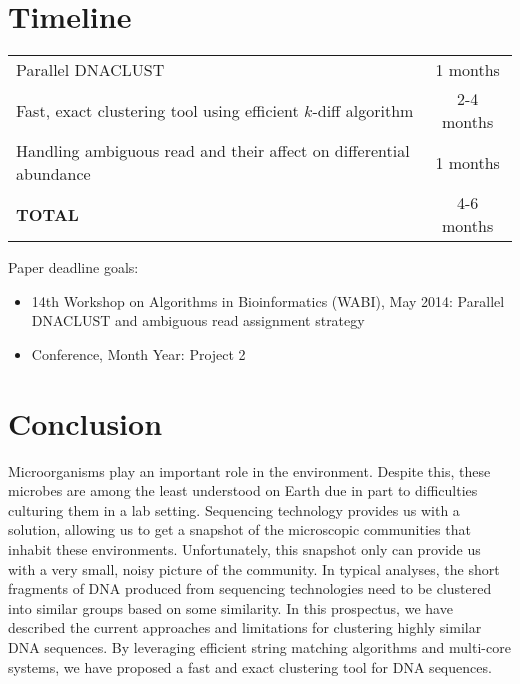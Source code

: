 \documentclass{article}
\begin{document}




%

\section{Timeline}

\begin{center}
\begin{tabular}{|l|c|}
\hline
Parallel DNACLUST & 1 months \\
Fast, exact clustering tool using efficient $k$-diff algorithm & 2-4 months \\
Handling ambiguous read and their affect on differential abundance & 1 months \\
\hline
\textbf{TOTAL} & 4-6 months \\
\hline
\end{tabular}
\end{center}

Paper deadline goals:

\begin{itemize}
\item 14th Workshop on Algorithms in Bioinformatics (WABI), May 2014: Parallel DNACLUST and ambiguous read assignment strategy
\item Conference, Month Year: Project 2
\end{itemize}


\section{Conclusion}

Microorganisms play an important role in the environment.
Despite this, these microbes are among the least understood on Earth due in part to difficulties culturing them in a lab setting.
Sequencing technology provides us with a solution, allowing us to get a snapshot of the microscopic communities that inhabit these environments.
Unfortunately, this snapshot only can provide us with a very small, noisy picture of the community.
In typical analyses, the short fragments of DNA produced from sequencing technologies need to be clustered into similar groups based on some similarity.
In this prospectus, we have described the current approaches and limitations for clustering highly similar DNA sequences.
By leveraging efficient string matching algorithms and multi-core systems, we have proposed a fast and exact clustering tool for DNA sequences.
\end{document}

